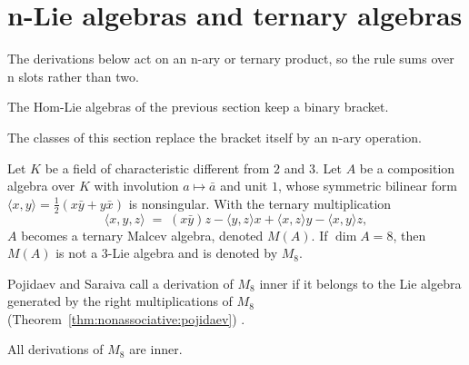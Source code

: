 \section{n-Lie algebras and ternary algebras}\label{sec:nonassociative:n-ary}

The derivations below act on an n-ary or ternary product, so the rule sums
over n slots rather than two.

The Hom-Lie algebras of the previous section keep a binary bracket.

The classes of this section replace the bracket itself by an n-ary
operation.

\begin{example}
\label{ex:nonassociative:m8}
Let $K$ be a field of characteristic different from $2$ and $3$. Let $A$
be a composition algebra over $K$ with involution $a\mapsto\bar a$ and
unit $1$, whose symmetric bilinear form
$\langle x,y\rangle=\tfrac{1}{2}(x\bar y+y\bar x)$ is nonsingular.
With the ternary multiplication
\[
\langle x,y,z\rangle
\;=\;(x\bar y)z-\langle y,z\rangle x+\langle x,z\rangle y
-\langle x,y\rangle z,
\]
$A$ becomes a ternary Malcev algebra, denoted $M(A)$. If $\dim A=8$, then
$M(A)$ is not a $3$-Lie algebra and is denoted by $M_8$.
\end{example}

Pojidaev and Saraiva call a derivation of $M_8$ inner if it belongs to the
Lie algebra generated by the right multiplications of $M_8$ (Theorem~\ref{thm:nonassociative:pojidaev})
\cite[Section~2, p.~3596]{PojidaevSarahva2006}.\begin{theorem}
\label{thm:nonassociative:pojidaev}
All derivations of $M_8$ are inner.
\end{theorem}

